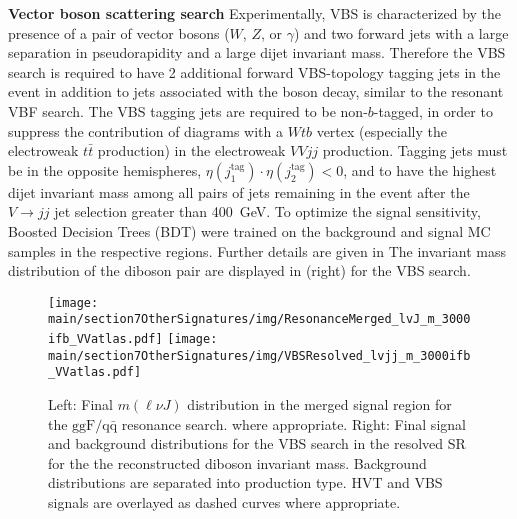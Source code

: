 \textbf{Vector boson scattering search}
Experimentally, VBS is characterized by the presence of a pair of vector bosons ($W$, $Z$, or $\gamma$) and two forward jets with a large
separation in pseudorapidity and a large dijet invariant mass.
Therefore the VBS search is required to have 2 additional forward VBS-topology tagging jets in the event in addition to jets associated 
with the boson decay, similar to the resonant VBF search.
The VBS tagging jets are required to be non-$b$-tagged, in order to suppress the contribution of diagrams with a $Wtb$ vertex
(especially the electroweak $t\bar{t}$ production) in the electroweak $VVjj$ production.
Tagging jets must be in the opposite hemispheres, $\eta(j_1^{\mathrm{tag}}) \cdot \eta(j_2^{\mathrm{tag}}) < 0$,
and to have the highest dijet invariant mass among all pairs of jets remaining in the event after the $V \rightarrow jj$ jet selection greater than 400~GeV.  
To optimize the signal sensitivity, Boosted Decision Trees (BDT) were trained on the background 
and signal MC samples in the respective regions. Further details are given in %
The invariant mass distribution of the diboson pair are displayed in  (right) for the VBS search. \\

\begin{figure}[!ht]
  \begin{centering}
    \texttt{[image: \\main/section7OtherSignatures/img/ResonanceMerged\_lvJ\_m\_3000ifb\_VVatlas.pdf]}
    \texttt{[image: \\main/section7OtherSignatures/img/VBSResolved\_lvjj\_m\_3000ifb\_VVatlas.pdf]}
    \caption{Left: Final $m(\ell\nu J)$ distribution in the merged signal region for the $\mathrm{ggF/q\bar{q}}$ resonance search. 
where appropriate. Right: Final signal and background distributions for the VBS search in the resolved SR for the 
the reconstructed diboson invariant mass. 
Background distributions are separated into production type. HVT and VBS signals are overlayed as dashed curves where appropriate.  }
    \label{fig:distributions_VVatlas}
  \end{centering}
\end{figure}

